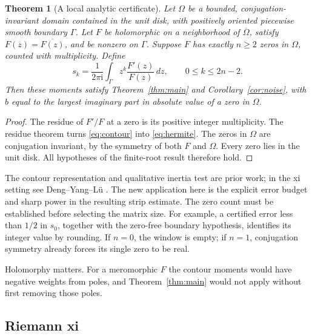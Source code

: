 \documentclass[11pt]{article}
\newtheorem{theorem}{Theorem}[section]
\theoremstyle{definition}
\newcommand{\I}{\mathrm i}
\begin{document}
\begin{theorem}[A local analytic certificate]
\label{thm:contour}
Let $\Omega$ be a bounded, conjugation-invariant domain contained in the
unit disk, with positively oriented piecewise smooth boundary $\Gamma$.
Let $F$ be holomorphic on a neighborhood of $\overline\Omega$, satisfy
$F(\overline z)=\overline{F(z)}$, and be nonzero on $\Gamma$.
Suppose $F$ has exactly $n\geq2$ zeros in $\Omega$, counted with
multiplicity. Define
\begin{equation}
 s_k=\frac1{2\pi\I}\int_\Gamma
 z^k\frac{F'(z)}{F(z)}\,dz,\qquad 0\leq k\leq2n-2.
 \label{eq:contour}
\end{equation}
Then these moments satisfy Theorem~\ref{thm:main} and
Corollary~\ref{cor:noise}, with $b$ equal to the largest imaginary part
in absolute value of a zero in $\Omega$.
\end{theorem}

\begin{proof}
The residue of $F'/F$ at a zero is its positive integer multiplicity.
The residue theorem turns \eqref{eq:contour} into \eqref{eq:hermite}.
The zeros in $\Omega$ are conjugation invariant, by the symmetry of both
$F$ and $\Omega$. Every zero lies in the unit disk. All hypotheses of the
finite-root result therefore hold.
\end{proof}

The contour representation and qualitative inertia test are prior work;
in the xi setting see Deng--Yang--L\"u \cite{deng}. The new application
here is the explicit error budget and sharp power in the resulting strip
estimate. The zero count must be established before selecting the matrix
size. For example, a certified error less than $1/2$ in $s_0$, together with
the zero-free boundary hypothesis, identifies its integer value by rounding.
If $n=0$, the window is empty; if $n=1$, conjugation symmetry already forces
its single zero to be real.

Holomorphy matters. For a meromorphic $F$ the contour moments would have
negative weights from poles, and Theorem~\ref{thm:main} would not apply
without first removing those poles.

\subsection{Riemann xi}
\end{document}
